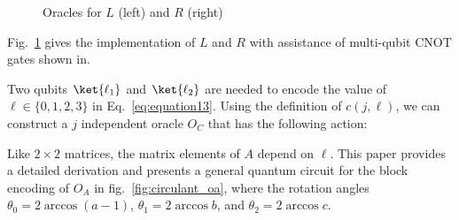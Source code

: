 \documentclass{article}
\begin{document}
\begin{figure}[htbp]
  \centering
  \caption{Oracles for $L$ (left) and $R$ (right)}
  \label{fig:circulant_lr}
\end{figure}

Fig.~\ref{fig:circulant_lr} gives the implementation of $L$ and $R$ with assistance of multi-qubit CNOT gates shown in.

Two qubits $\ket{\ell_1}$ and $\ket{\ell_2}$ are needed to encode the value of $\ell \in \{0,1,2,3\}$ in Eq.~\eqref{eq:equation13}. Using the definition of $c(j, \ell)$, we can construct a $j$ independent oracle $O_C$ that has the following action:

Like $2\times2$ matrices, the matrix elements of $A$ depend on $\ell$. This paper provides a detailed derivation and presents a general quantum circuit for the block encoding of $O_A$ in fig.~\ref{fig:circulant_oa}, where the rotation angles $\theta_0 = 2\arccos (a-1)$, $\theta_1 = 2\arccos b$, and $\theta_2 = 2\arccos c$.
\end{document}
